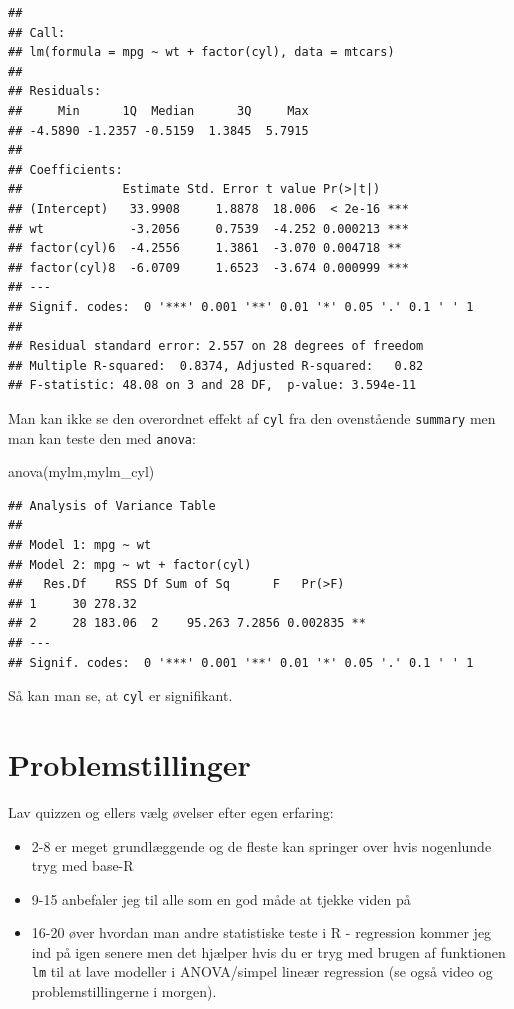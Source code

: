 \documentclass[
]{book}
\newenvironment{Shaded}{\begin{snugshade}}{\end{snugshade}}
\newcommand{\FunctionTok}[1]{\textcolor[rgb]{0.00,0.00,0.00}{#1}}
\newcommand{\NormalTok}[1]{#1}
\providecommand{\tightlist}{%
  \setlength{\itemsep}{0pt}\setlength{\parskip}{0pt}}
\begin{document}
\begin{verbatim}
## 
## Call:
## lm(formula = mpg ~ wt + factor(cyl), data = mtcars)
## 
## Residuals:
##     Min      1Q  Median      3Q     Max 
## -4.5890 -1.2357 -0.5159  1.3845  5.7915 
## 
## Coefficients:
##              Estimate Std. Error t value Pr(>|t|)    
## (Intercept)   33.9908     1.8878  18.006  < 2e-16 ***
## wt            -3.2056     0.7539  -4.252 0.000213 ***
## factor(cyl)6  -4.2556     1.3861  -3.070 0.004718 ** 
## factor(cyl)8  -6.0709     1.6523  -3.674 0.000999 ***
## ---
## Signif. codes:  0 '***' 0.001 '**' 0.01 '*' 0.05 '.' 0.1 ' ' 1
## 
## Residual standard error: 2.557 on 28 degrees of freedom
## Multiple R-squared:  0.8374, Adjusted R-squared:   0.82 
## F-statistic: 48.08 on 3 and 28 DF,  p-value: 3.594e-11
\end{verbatim}

Man kan ikke se den overordnet effekt af \texttt{cyl} fra den ovenstående \texttt{summary} men man kan teste den med \texttt{anova}:

\begin{Shaded}
\begin{Highlighting}[]
\FunctionTok{anova}\NormalTok{(mylm,mylm\_cyl)}
\end{Highlighting}
\end{Shaded}

\begin{verbatim}
## Analysis of Variance Table
## 
## Model 1: mpg ~ wt
## Model 2: mpg ~ wt + factor(cyl)
##   Res.Df    RSS Df Sum of Sq      F   Pr(>F)   
## 1     30 278.32                                
## 2     28 183.06  2    95.263 7.2856 0.002835 **
## ---
## Signif. codes:  0 '***' 0.001 '**' 0.01 '*' 0.05 '.' 0.1 ' ' 1
\end{verbatim}

Så kan man se, at \texttt{cyl} er signifikant.

\hypertarget{problemstillinger}{%
\section{Problemstillinger}\label{problemstillinger}}

Lav quizzen og ellers vælg øvelser efter egen erfaring:

\begin{itemize}
\tightlist
\item
  2-8 er meget grundlæggende og de fleste kan springer over hvis nogenlunde tryg med base-R
\item
  9-15 anbefaler jeg til alle som en god måde at tjekke viden på
\item
  16-20 øver hvordan man andre statistiske teste i R - regression kommer jeg ind på igen senere men det hjælper hvis du er tryg med brugen af funktionen \texttt{lm} til at lave modeller i ANOVA/simpel lineær regression (se også video og problemstillingerne i morgen).
\end{itemize}
\end{document}
